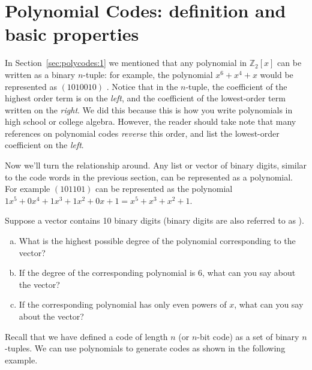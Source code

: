 \section{Polynomial Codes: definition and basic properties}

In Section~\ref{sec:polycodes:1} we mentioned that  any polynomial in $\mathbb{Z}_2[x]$ can be written as a binary $n$-tuple: for example, the polynomial $x^6 + x^4 + x$ would be represented as $(1010010)$ . Notice that in the $n$-tuple, the coefficient of the highest order term is on the \emph{left}, and the coefficient of the lowest-order term written on the \emph{right}.  We did this because this is how you write polynomials in high school or college algebra.  However, the reader should take note that many references on polynomial codes  \emph{reverse} this order, and list the lowest-order coefficient on the \emph{left}.

Now we'll turn the relationship around. Any list or vector of binary digits, similar to the code words in the previous section, can be represented as a polynomial. For example $(101101)$ can be represented as the polynomial $1x^5 + 0x^4 + 1x^3 + 1x^2 + 0x + 1 = x^5 + x^3 + x^2 + 1$.  

\begin{exercise}{}
Suppose a vector contains 10 binary digits (binary digits are also referred to as ).
\begin{enumerate}[(a)]
\item
 What is the highest possible degree of the polynomial corresponding to the vector?
\item
If the degree of the corresponding polynomial is 6, what can you say about the vector?
\item
If the corresponding polynomial has only even powers of $x$, what can you say about the vector?
\end{enumerate}
\end{exercise}

Recall that we have defined a code of length $n$ (or $n$-bit code) as a set of binary $n$-tuples.  We can use polynomials to generate codes as shown in the following example. 

